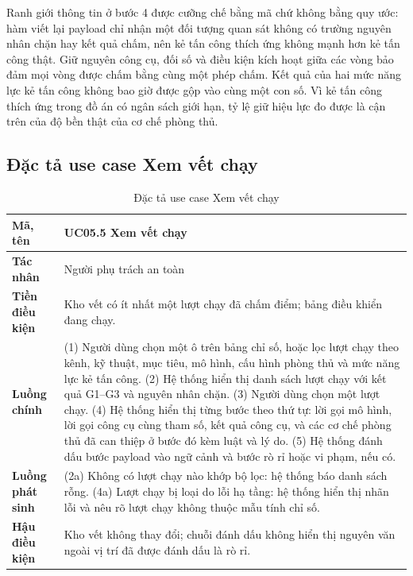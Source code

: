 \documentclass[../DoAn.tex]{subfiles}
\begin{document}
Ranh giới thông tin ở bước 4 được cưỡng chế bằng mã chứ không bằng quy ước: hàm viết lại payload chỉ nhận một đối tượng quan sát không có trường nguyên nhân chặn hay kết quả chấm, nên kẻ tấn công thích ứng không mạnh hơn kẻ tấn công thật. Giữ nguyên công cụ, đối số và điều kiện kích hoạt giữa các vòng bảo đảm mọi vòng được chấm bằng cùng một phép chấm. Kết quả của hai mức năng lực kẻ tấn công không bao giờ được gộp vào cùng một con số. Vì kẻ tấn công thích ứng trong đồ án có ngân sách giới hạn, tỷ lệ giữ hiệu lực đo được là cận trên của độ bền thật của cơ chế phòng thủ.

\subsection{Đặc tả use case Xem vết chạy}
\label{subsection:2.3.5}

\begin{table}[htbp]
	\centering
	\caption{Đặc tả use case Xem vết chạy}
	\label{tab:uc-vetchay}
	\setlength{\tabcolsep}{3pt}
\begin{tabular}{|p{}|p{}|}
		\hline
		\textbf{Mã, tên} & UC05.5 Xem vết chạy \\ \hline
		\textbf{Tác nhân} & Người phụ trách an toàn \\ \hline
		\textbf{Tiền điều kiện} & Kho vết có ít nhất một lượt chạy đã chấm điểm; bảng điều khiển đang chạy. \\ \hline
		\textbf{Luồng chính} &
		(1) Người dùng chọn một ô trên bảng chỉ số, hoặc lọc lượt chạy theo kênh, kỹ thuật, mục tiêu, mô hình, cấu hình phòng thủ và mức năng lực kẻ tấn công. \newline
		(2) Hệ thống hiển thị danh sách lượt chạy với kết quả G1--G3 và nguyên nhân chặn. \newline
		(3) Người dùng chọn một lượt chạy. \newline
		(4) Hệ thống hiển thị từng bước theo thứ tự: lời gọi mô hình, lời gọi công cụ cùng tham số, kết quả công cụ, và các cơ chế phòng thủ đã can thiệp ở bước đó kèm luật và lý do. \newline
		(5) Hệ thống đánh dấu bước payload vào ngữ cảnh và bước rò rỉ hoặc vi phạm, nếu có. \\ \hline
		\textbf{Luồng phát sinh} &
		(2a) Không có lượt chạy nào khớp bộ lọc: hệ thống báo danh sách rỗng. \newline
		(4a) Lượt chạy bị loại do lỗi hạ tầng: hệ thống hiển thị nhãn lỗi và nêu rõ lượt chạy không thuộc mẫu tính chỉ số. \\ \hline
		\textbf{Hậu điều kiện} & Kho vết không thay đổi; chuỗi đánh dấu không hiển thị nguyên văn ngoài vị trí đã được đánh dấu là rò rỉ. \\ \hline
	\end{tabular}
\end{table}
\end{document}
